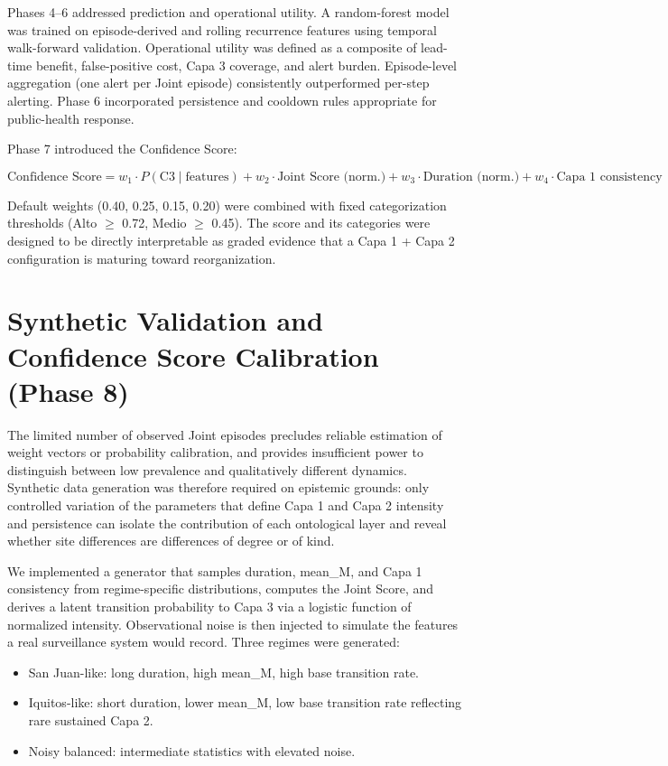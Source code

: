 \documentclass[11pt,a4paper]{article}
\begin{document}
Phases 4--6 addressed prediction and operational utility. A random-forest model was trained on episode-derived and rolling recurrence features using temporal walk-forward validation. Operational utility was defined as a composite of lead-time benefit, false-positive cost, Capa 3 coverage, and alert burden. Episode-level aggregation (one alert per Joint episode) consistently outperformed per-step alerting. Phase 6 incorporated persistence and cooldown rules appropriate for public-health response.

Phase 7 introduced the Confidence Score:

\[
\text{Confidence Score} = w_1 \cdot P(\text{C3} \mid \text{features}) + w_2 \cdot \text{Joint Score (norm.)} + w_3 \cdot \text{Duration (norm.)} + w_4 \cdot \text{Capa 1 consistency}
\]

Default weights (0.40, 0.25, 0.15, 0.20) were combined with fixed categorization thresholds (Alto $\geq$ 0.72, Medio $\geq$ 0.45). The score and its categories were designed to be directly interpretable as graded evidence that a Capa 1 + Capa 2 configuration is maturing toward reorganization.

\section{Synthetic Validation and Confidence Score Calibration (Phase 8)}

The limited number of observed Joint episodes precludes reliable estimation of weight vectors or probability calibration, and provides insufficient power to distinguish between low prevalence and qualitatively different dynamics. Synthetic data generation was therefore required on epistemic grounds: only controlled variation of the parameters that define Capa 1 and Capa 2 intensity and persistence can isolate the contribution of each ontological layer and reveal whether site differences are differences of degree or of kind.

We implemented a generator that samples duration, mean\_M, and Capa 1 consistency from regime-specific distributions, computes the Joint Score, and derives a latent transition probability to Capa 3 via a logistic function of normalized intensity. Observational noise is then injected to simulate the features a real surveillance system would record. Three regimes were generated:

\begin{itemize}
    \item San Juan-like: long duration, high mean\_M, high base transition rate.
    \item Iquitos-like: short duration, lower mean\_M, low base transition rate reflecting rare sustained Capa 2.
    \item Noisy balanced: intermediate statistics with elevated noise.
\end{itemize}
\end{document}
